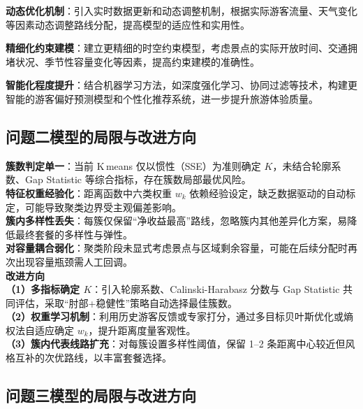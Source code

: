 \noindent\textbf{动态优化机制}：引入实时数据更新和动态调整机制，根据实际游客流量、天气变化等因素动态调整路线分配，提高模型的适应性和实用性。

\noindent\textbf{精细化约束建模}：建立更精细的时空约束模型，考虑景点的实际开放时间、交通拥堵状况、季节性容量变化等因素，提高约束建模的准确性。

\noindent\textbf{智能化程度提升}：结合机器学习方法，如深度强化学习、协同过滤等技术，构建更智能的游客偏好预测模型和个性化推荐系统，进一步提升旅游体验质量。

\subsection[\hspace{-2pt}问题二模型的局限与改进方向]{{\heiti{}\hspace{-8pt}问题二模型的局限与改进方向}}\label{subsection6: 问题二模型改进}

\noindent\textbf{簇数判定单一}：当前 K\,means 仅以惯性（SSE）为准则确定 $K$，未结合轮廓系数、Gap Statistic 等综合指标，存在簇数局部最优风险。\\[2pt]
\noindent\textbf{特征权重经验化}：距离函数中六类权重 $w_k$ 依赖经验设定，缺乏数据驱动的自动标定，可能导致聚类边界受主观偏差影响。\\[2pt]
\noindent\textbf{簇内多样性丢失}：每簇仅保留“净收益最高”路线，忽略簇内其他差异化方案，易降低最终套餐的多样性与弹性。\\[2pt]
\noindent\textbf{对容量耦合弱化}：聚类阶段未显式考虑景点与区域剩余容量，可能在后续分配时再次出现容量瓶颈需人工回调。\\[6pt]

\noindent\textbf{改进方向}\\
\noindent\textbf{（1）多指标确定 $K$}：引入轮廓系数、Calinski-Harabasz 分数与 Gap Statistic 共同评估，采取“肘部+稳健性”策略自动选择最佳簇数。\\
\noindent\textbf{（2）权重学习机制}：利用历史游客反馈或专家打分，通过多目标贝叶斯优化或熵权法自适应确定 $w_k$，提升距离度量客观性。\\
\noindent\textbf{（3）簇内代表线路扩充}：对每簇设置多样性阈值，保留 1–2 条距离中心较近但风格互补的次优路线，以丰富套餐选择。\\

\subsection[\hspace{-2pt}问题三模型的局限与改进方向]{{\heiti{}\hspace{-8pt}问题三模型的局限与改进方向}}\label{subsection7: 问题三模型改进}


